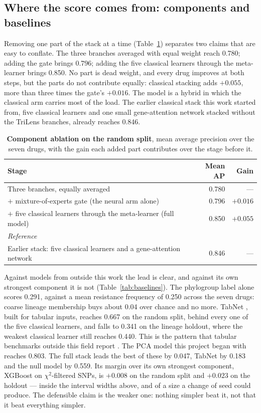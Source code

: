 \subsection*{Where the score comes from: components and baselines}

Removing one part of the stack at a time (Table~\ref{tab:ablation}) separates two claims that are
easy to conflate. The three branches averaged with equal weight reach 0.780; adding the gate brings
0.796; adding the five classical learners through the meta-learner brings 0.850. No part is dead
weight, and every drug improves at both steps, but the parts do not contribute equally: classical
stacking adds $+0.055$, more than three times the gate's $+0.016$. The model is a hybrid in which
the classical arm carries most of the load. The earlier classical stack this work started from,
five classical learners and one small gene-attention network stacked without the TriLens branches,
already reaches 0.846.

\begin{table}[t]\centering\small
\caption{\textbf{Component ablation on the random split}, mean average precision over the seven
drugs, with the gain each added part contributes over the stage before it.}
\label{tab:ablation}
\begin{tabular}{lrr}
\toprule
Stage & Mean AP & Gain \\
\midrule
Three branches, equally averaged & 0.780 & --- \\
$+$ mixture-of-experts gate (the neural arm alone) & 0.796 & $+0.016$ \\
$+$ five classical learners through the meta-learner (full model) & 0.850 & $+0.055$ \\
\midrule
\multicolumn{3}{l}{\textit{Reference}} \\
Earlier stack: five classical learners and a gene-attention network & 0.846 & --- \\
\bottomrule
\end{tabular}
\end{table}

Against models from outside this work the lead is clear, and against its own strongest component it
is not (Table~\ref{tab:baselines}). The phylogroup label alone scores 0.291, against a mean
resistance frequency of 0.250 across the seven drugs: coarse lineage membership buys about 0.04
over chance and no more. TabNet \cite{arik2021tabnet}, built for tabular inputs, reaches 0.667 on
the random split, behind every one of the five classical learners, and falls to 0.341 on the
lineage holdout, where the weakest classical learner still reaches 0.440. This is the pattern that
tabular benchmarks outside this field report \cite{grinsztajn2022trees,shwartzziv2022tabular}. The
PCA model this project began with reaches 0.803. The full stack leads the best of these by 0.047,
TabNet by 0.183 and the null model by 0.559. Its margin over its own strongest component, XGBoost
on $\chi^2$-filtered SNPs, is $+0.008$ on the random split and $+0.023$ on the holdout --- inside
the interval widths above, and of a size a change of seed could produce. The defensible claim is
the weaker one: nothing simpler beat it, not that it beat everything simpler.

